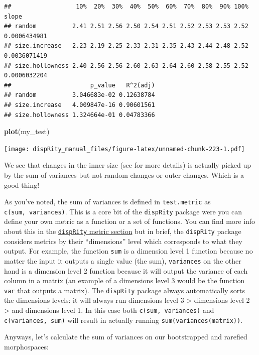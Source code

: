 \documentclass[
]{book}
\newenvironment{Shaded}{\begin{snugshade}}{\end{snugshade}}
\newcommand{\KeywordTok}[1]{\textcolor[rgb]{0.13,0.29,0.53}{\textbf{#1}}}
\newcommand{\NormalTok}[1]{#1}
\begin{document}
\begin{verbatim}
##                  10%  20%  30%  40%  50%  60%  70%  80%  90% 100%        slope
## random          2.41 2.51 2.56 2.50 2.54 2.51 2.52 2.53 2.53 2.52 0.0006434981
## size.increase   2.23 2.19 2.25 2.33 2.31 2.35 2.43 2.44 2.48 2.52 0.0036071419
## size.hollowness 2.40 2.56 2.56 2.60 2.63 2.64 2.60 2.58 2.55 2.52 0.0006032204
##                      p_value   R^2(adj)
## random          3.046683e-02 0.12638784
## size.increase   4.009847e-16 0.90601561
## size.hollowness 1.324664e-01 0.04783366
\end{verbatim}

\begin{Shaded}
\begin{Highlighting}[]
\KeywordTok{plot}\NormalTok{(my\_test)}
\end{Highlighting}
\end{Shaded}

\texttt{[image: dispRity\_manual\_files/figure-latex/unnamed-chunk-223-1.pdf]}

We see that changes in the inner size (see \citet{moms} for more details) is actually picked up by the sum of variances but not random changes or outer changes. Which is a good thing!

As you've noted, the sum of variances is defined in \texttt{test.metric} as \texttt{c(sum,\ variances)}. This is a core bit of the \texttt{dispRity} package were you can define your own metric as a function or a set of functions.
You can find more info about this in the \protect\hyperlink{disparity-metrics}{\texttt{dispRity} metric section} but in brief, the \texttt{dispRity} package considers metrics by their ``dimensions'' level which corresponds to what they output. For example, the function \texttt{sum} is a dimension level 1 function because no matter the input it outputs a single value (the sum), \texttt{variances} on the other hand is a dimension level 2 function because it will output the variance of each column in a matrix (an example of a dimensions level 3 would be the function \texttt{var} that outputs a matrix).
The \texttt{dispRity} package always automatically sorts the dimensions levels: it will always run dimensions level 3 \textgreater{} dimensions level 2 \textgreater{} and dimensions level 1. In this case both \texttt{c(sum,\ variances)} and \texttt{c(variances,\ sum)} will result in actually running \texttt{sum(variances(matrix))}.

Anyways, let's calculate the sum of variances on our bootstrapped and rarefied morphospaces:
\end{document}
